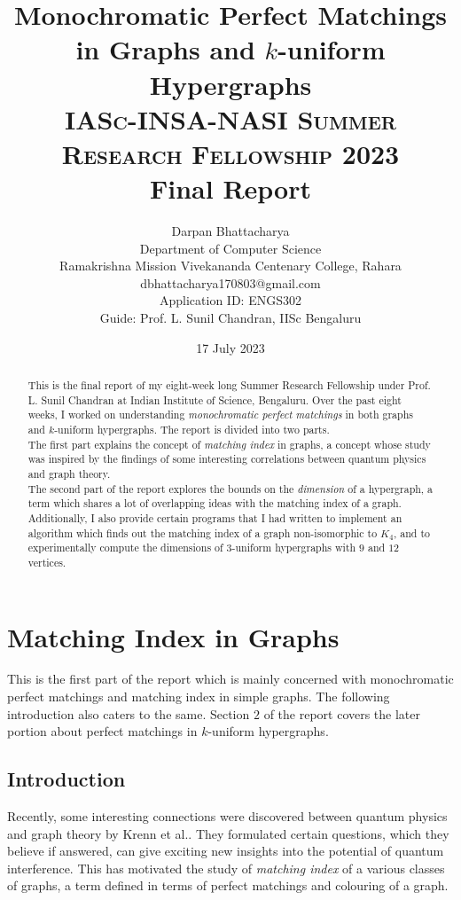 \documentclass[11pt]{article}
\title{\Huge{\textbf{Monochromatic Perfect Matchings in Graphs and $k$-uniform Hypergraphs}}\\ \vspace{1cm}
\Large \textsc{IASc-INSA-NASI Summer Research Fellowship 2023}\\ \vspace{0.2cm}
\Large Final Report\\ \vspace{2in}
}
\author{\Large Darpan Bhattacharya \vspace{1cm}\\
\footnotesize{Department of Computer Science}\\
\footnotesize{Ramakrishna Mission Vivekananda Centenary College, Rahara}\\ 
\ttfamily\footnotesize{dbhattacharya170803@gmail.com}\vspace{1cm}\\ 
\fontfamily{cmss}\footnotesize{Application ID: ENGS302}\\
\fontfamily{cmss}\footnotesize{Guide: Prof. L. Sunil Chandran, IISc Bengaluru}}
\date{17 July 2023}
\begin{document}
\maketitle


\pagebreak

\begin{abstract}
\normalsize
This is the final report of my eight-week long Summer Research Fellowship under Prof. L. Sunil Chandran at Indian Institute of Science, Bengaluru. Over the past eight weeks, I worked on understanding \textit{monochromatic perfect matchings} in both graphs and $k$-uniform hypergraphs. The report is divided into two parts.\smallskip\\
The first part explains the concept of \textit{matching index} in graphs, a concept whose study was inspired by the findings of some interesting correlations between quantum physics and graph theory. \smallskip\\
The second part of the report explores the bounds on the \textit{dimension} of a hypergraph, a term which shares a lot of overlapping ideas with the matching index of a graph.\smallskip\\
Additionally, I also provide certain programs that I had written to implement an algorithm which finds out the matching index of a graph non-isomorphic to $K_4$, and to experimentally compute the dimensions of $3$-uniform hypergraphs with $9$ and $12$ vertices.
\end{abstract}\bigskip

\section{Matching Index in Graphs}
This is the first part of the report which is mainly concerned with monochromatic perfect matchings and matching index in simple graphs. The following introduction also caters to the same. Section $2$ of the report covers the later portion about perfect matchings in $k$-uniform hypergraphs.

\subsection*{Introduction}
Recently, some interesting connections were discovered between quantum physics and graph theory by Krenn et al.\cite{Krenn1,Krenn2,Krenn3}. They formulated certain questions, which they believe if answered, can give exciting new insights into the potential of quantum interference. This has motivated the study of \textit{matching index} of a various classes of graphs, a term defined in terms of perfect matchings and colouring of a graph.
\end{document}

